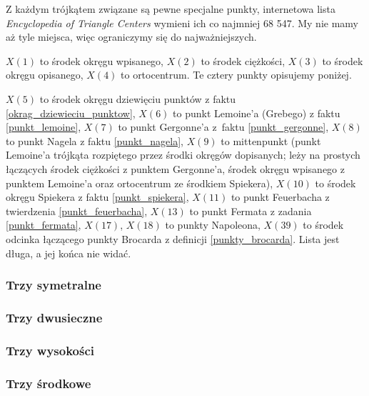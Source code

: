 Z każdym trójkątem związane są pewne specjalne punkty, internetowa lista \emph{Encyclopedia of Triangle Centers} wymieni ich co najmniej 68 547.
My nie mamy aż tyle miejsca, więc ograniczymy się do najważniejszych.

$X(1)$ to środek okręgu wpisanego, 
$X(2)$ to środek ciężkości,
$X(3)$ to środek okręgu opisanego,
$X(4)$ to ortocentrum.
Te cztery punkty opisujemy poniżej.

$X(5)$ to środek okręgu dziewięciu punktów z faktu \ref{okrag_dziewieciu_punktow},
$X(6)$ to punkt Lemoine'a (Grebego) z faktu \ref{punkt_lemoine},
$X(7)$ to punkt Gergonne'a z~faktu \ref{punkt_gergonne},
$X(8)$ to punkt Nagela z faktu \ref{punkt_nagela}, 
$X(9)$ to mittenpunkt (punkt Lemoine'a trójkąta rozpiętego przez środki okręgów dopisanych; leży na prostych łączących środek ciężkości z punktem Gergonne'a, środek okręgu wpisanego z punktem Lemoine'a oraz ortocentrum ze środkiem Spiekera), %
$X(10)$ to środek okręgu Spiekera z faktu \ref{punkt_spiekera},
$X(11)$ to punkt Feuerbacha z twierdzenia \ref{punkt_feuerbacha},
$X(13)$ to punkt Fermata z zadania \ref{punkt_fermata},
$X(17)$, $X(18)$ to punkty Napoleona,
$X(39)$ to środek odcinka łączącego punkty Brocarda z definicji \ref{punkty_brocarda}.
Lista jest długa, a jej końca nie widać.

\subsubsection{Trzy symetralne}


\subsubsection{Trzy dwusieczne}


\subsubsection{Trzy wysokości}


\subsubsection{Trzy środkowe}


%